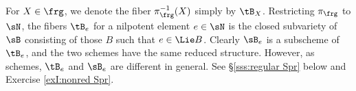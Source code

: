 For $X\in \frg$, we denote the fiber $\pi_{\frg}^{-1}(X)$ simply by $\tB_{X}$.  Restricting $\pi_{\frg}$ to $\sN$, the fibers $\tB_{e}$ for a nilpotent element $e\in\sN$ is the closed subvariety of $\sB$ consisting of those $B$ such that $e\in\Lie B$.  Clearly $\sB_{e}$ is a subscheme of $\tB_{e}$, and the two schemes have the same reduced structure. However, as schemes, $\tB_{e}$ and $\sB_{e}$ are different in general. See \S\ref{sss:regular Spr} below and Exercise \ref{exI:nonred Spr}.


